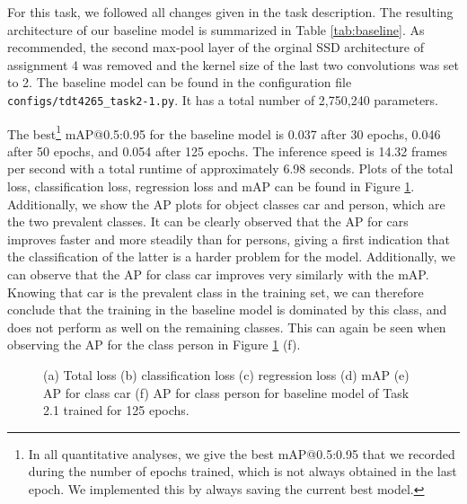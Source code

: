 \documentclass{article}
\begin{document}
For this task, we followed all changes given in the task description. The resulting architecture of our baseline model is summarized in Table \ref{tab:baseline}. As recommended, the second max-pool layer of the orginal SSD architecture of assignment 4  was removed and the kernel size of the last two convolutions was set to 2. The baseline model can be found in the configuration file \texttt{configs/tdt4265\_task2-1.py}. It has a total number of 2,750,240 parameters.

The best\footnote{In all quantitative analyses, we give the best mAP@0.5:0.95 that we recorded during the number of epochs trained, which is not always obtained in the last epoch. We implemented this by always saving the current best model.} mAP@0.5:0.95 for the baseline model is 0.037 after 30 epochs, 0.046 after 50 epochs, and 0.054 after 125 epochs. The inference speed is 14.32 frames per second with a total runtime of approximately 6.98 seconds. Plots of the total loss, classification loss, regression loss and mAP can be found in Figure \ref{fig:loss-2-1}. Additionally, we show the AP plots for object classes car and person, which are the two prevalent classes. It can be clearly observed that the AP for cars improves faster and more steadily than for persons, giving a first indication that the classification of the latter is a harder problem for the model. Additionally, we can observe that the AP for class car improves very similarly with the mAP. Knowing that car is the prevalent class in the training set, we can therefore conclude that the training in the baseline model is dominated by this class, and does not perform as well on the remaining classes. This can again be seen when observing the AP for the class person in Figure \ref{fig:loss-2-1} (f).

\begin{figure}[t!]
    \centering
    \subfigure[]{}
    \vspace{-0.15cm}
    \subfigure[]{}
    \subfigure[]{}
    \subfigure[]{}
    \subfigure[]{}
    \subfigure[]{}
    \vspace{-0.4cm}
    \caption{(a) Total loss (b) classification loss (c) regression loss (d) mAP (e) AP for class car (f) AP for class person for baseline model of Task 2.1 trained for 125 epochs.}
    \label{fig:loss-2-1}
\end{figure}
\end{document}
